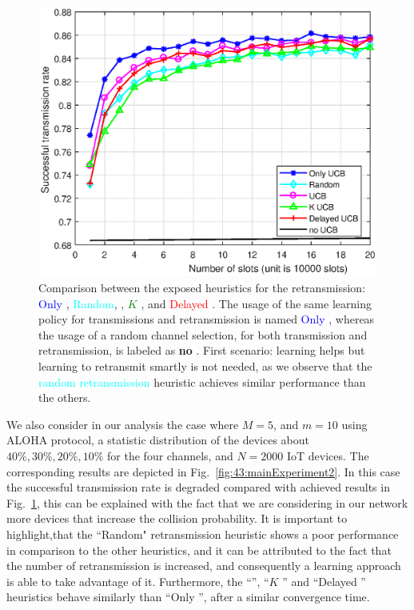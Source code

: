 \begin{figure}[h!]  %
	\centering
	\includegraphics[width=0.75\linewidth]{ResultsUCB.eps}
	\caption[First comparison between the exposed heuristics for the retransmission: Only \UCB, Random, \UCB, $K$ \UCB, and Delayed \UCB]{
		Comparison between the exposed heuristics for the retransmission: \textcolor{blue}{Only \UCB}, \textcolor{cyan}{Random}, \textcolor{purple}{\UCB}, \textcolor{green}{$K$ \UCB}, and \textcolor{red}{Delayed \UCB}.
		The usage of the same learning policy for transmissions and retransmission is named \textcolor{blue}{Only \UCB{}},
		whereas the usage of a random channel selection, for both transmission and retransmission, is labeled as \textbf{no \UCB{}}.
		First scenario: learning helps but learning to retransmit smartly is not needed, as we observe that the \textcolor{cyan}{random retransmission} heuristic achieves similar performance than the others.
	}
	\label{fig:43:mainExperiment1}
\end{figure}

We also consider in our analysis the case where $M=5$, and $m=10$ using ALOHA protocol, a statistic distribution of the devices about $40\%, 30\%, 20\%, 10\%$ for the four channels, and $N=2000$ IoT devices.
The corresponding results are depicted in Fig.~\ref{fig:43:mainExperiment2}.
In this case the successful transmission rate is degraded compared with achieved results in Fig.~\ref{fig:43:mainExperiment1}, this can be explained with the fact that we are considering in our network more devices that increase the collision probability.
It is important to highlight,that the ``Random" retransmission heuristic shows a poor performance in comparison to the other heuristics, and it can be attributed to the fact that the number of retransmission is increased, and consequently a
learning approach is able to take advantage of it.
Furthermore, the ``\UCB'', ``$K$ \UCB'' and ``Delayed \UCB'' heuristics behave similarly than ``Only \UCB'', after a similar convergence time.

